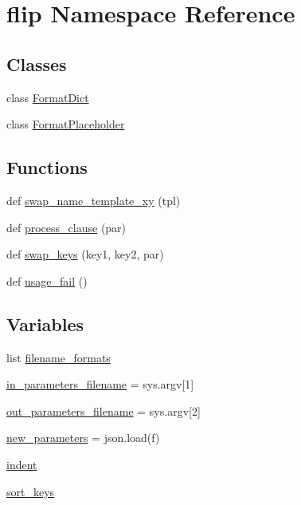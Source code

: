 \hypertarget{namespaceflip}{}\section{flip Namespace Reference}
\label{namespaceflip}
\subsection*{Classes}
\begin{DoxyCompactItemize}
\item 
class \hyperlink{classflip_1_1FormatDict}{Format\+Dict}
\item 
class \hyperlink{classflip_1_1FormatPlaceholder}{Format\+Placeholder}
\end{DoxyCompactItemize}
\subsection*{Functions}
\begin{DoxyCompactItemize}
\item 
def \hyperlink{namespaceflip_ab7a2db136b31facb1b5b57343f0c0637}{swap\+\_\+name\+\_\+template\+\_\+xy} (tpl)
\item 
def \hyperlink{namespaceflip_aa84e63bfdcf7ca6e507d9c3c2de25426}{process\+\_\+clause} (par)
\item 
def \hyperlink{namespaceflip_a38d89633b6a5be8799f4eac5ccd3071f}{swap\+\_\+keys} (key1, key2, par)
\item 
def \hyperlink{namespaceflip_ae413fa9e14cf37279d3e2b4ecfafca3d}{usage\+\_\+fail} ()
\end{DoxyCompactItemize}
\subsection*{Variables}
\begin{DoxyCompactItemize}
\item 
list \hyperlink{namespaceflip_a2b45e671bbccfbc4cfcb0a7d153e544d}{filename\+\_\+formats}
\item 
\hyperlink{namespaceflip_a42f5e1f2fe7c8a3a7af83d520ec610d7}{in\+\_\+parameters\+\_\+filename} = sys.\+argv\mbox{[}1\mbox{]}
\item 
\hyperlink{namespaceflip_a4defd3022c5c2b0de29705212115b6a7}{out\+\_\+parameters\+\_\+filename} = sys.\+argv\mbox{[}2\mbox{]}
\item 
\hyperlink{namespaceflip_a7a47fe7b1012ae7705c69a1a04a8820d}{new\+\_\+parameters} = json.\+load(f)
\item 
\hyperlink{namespaceflip_a821a655314c8dd55c67dc23de69813ba}{indent}
\item 
\hyperlink{namespaceflip_acb70e74cbeffe2b8d452c1df5678611f}{sort\+\_\+keys}
\end{DoxyCompactItemize}


